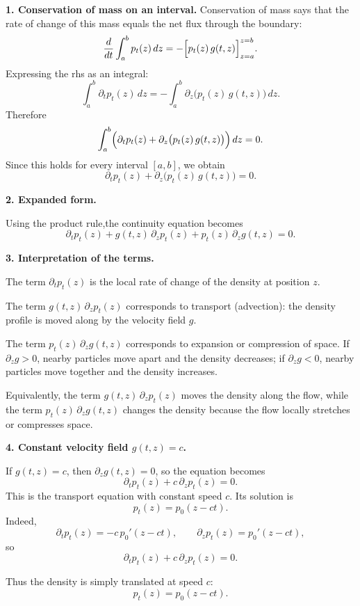 \begin{solution}

\textbf{1. Conservation of mass on an interval.}
Conservation of mass says that the rate of change of this mass equals the net flux through the boundary:
\[
\frac{d}{dt}\int_a^b p_t(z)\,dz
=
-\Bigl[p_t(z)\,g(t,z)\Bigr]_{z=a}^{z=b}.
\]
Expressing the rhs as an integral: 
\[
\int_a^b \partial_t p_t(z)\,dz
=
-\int_a^b \partial_z\bigl(p_t(z)\,g(t,z)\bigr)\,dz.
\]
Therefore
\[
\int_a^b \Bigl(\partial_t p_t(z)+\partial_z\bigl(p_t(z)\,g(t,z)\bigr)\Bigr)\,dz=0.
\]
Since this holds for every interval \([a,b]\), we obtain
\[
\partial_t p_t(z)+\partial_z\bigl(p_t(z)\,g(t,z)\bigr)=0.
\]

\bigskip

\textbf{2. Expanded form.}

Using the product rule,the continuity equation becomes
\[
\partial_t p_t(z)+g(t,z)\,\partial_z p_t(z)+p_t(z)\,\partial_z g(t,z)=0.
\]

\bigskip

\textbf{3. Interpretation of the terms.}

The term \(\partial_t p_t(z)\) is the local rate of change of the density at position \(z\).

The term \(g(t,z)\,\partial_z p_t(z)\) corresponds to transport (advection): the density profile is moved along by the velocity field \(g\).

The term \(p_t(z)\,\partial_z g(t,z)\) corresponds to expansion or compression of space. 
If \(\partial_z g>0\), nearby particles move apart and the density decreases; 
if \(\partial_z g<0\), nearby particles move together and the density increases.

Equivalently, the term \(g(t,z)\,\partial_z p_t(z)\) moves the density along the flow,
while the term \(p_t(z)\,\partial_z g(t,z)\) changes the density because the flow locally stretches or compresses space.

\bigskip

\textbf{4. Constant velocity field \(g(t,z)=c\).}

If \(g(t,z)=c\), then \(\partial_z g(t,z)=0\), so the equation becomes
\[
\partial_t p_t(z)+c\,\partial_z p_t(z)=0.
\]
This is the transport equation with constant speed \(c\). Its solution is
\[
p_t(z)=p_0(z-ct).
\]
Indeed,
\[
\partial_t p_t(z)=-c\,p_0'(z-ct),
\qquad
\partial_z p_t(z)=p_0'(z-ct),
\]
so
\[
\partial_t p_t(z)+c\,\partial_z p_t(z)=0.
\]

Thus the density is simply translated at speed \(c\):
\[
p_t(z)=p_0(z-ct).
\]

\end{solution}


